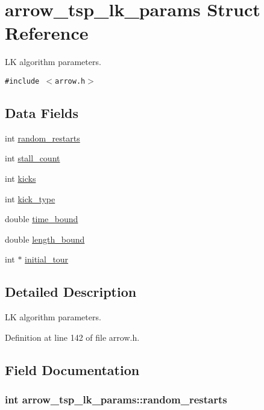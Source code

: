 \hypertarget{structarrow__tsp__lk__params}{
\section{arrow\_\-tsp\_\-lk\_\-params Struct Reference}
\label{structarrow__tsp__lk__params}
}
LK algorithm parameters.  


{\tt \#include $<$arrow.h$>$}

\subsection*{Data Fields}
\begin{CompactItemize}
\item 
int \hyperlink{structarrow__tsp__lk__params_ad3822d8c0e5d78b09618dbf716c3a4a}{random\_\-restarts}
\item 
int \hyperlink{structarrow__tsp__lk__params_ec5d500e1f1d7dabbbe0d1aae2abfcf8}{stall\_\-count}
\item 
int \hyperlink{structarrow__tsp__lk__params_9744a2fb89bca6b678fec9a6a17255ea}{kicks}
\item 
int \hyperlink{structarrow__tsp__lk__params_5b724dc268faa478b5b3e14c19abdc2a}{kick\_\-type}
\item 
double \hyperlink{structarrow__tsp__lk__params_22355808165edb6033ca771b88917cf5}{time\_\-bound}
\item 
double \hyperlink{structarrow__tsp__lk__params_36fb446a90e9b4c76702bd93f00357ea}{length\_\-bound}
\item 
int $\ast$ \hyperlink{structarrow__tsp__lk__params_1684519ac0bb6e529707b59f6cd7d528}{initial\_\-tour}
\end{CompactItemize}


\subsection{Detailed Description}
LK algorithm parameters. 

Definition at line 142 of file arrow.h.

\subsection{Field Documentation}
\hypertarget{structarrow__tsp__lk__params_ad3822d8c0e5d78b09618dbf716c3a4a}{
\subsubsection{\setlength{\rightskip}{0pt plus 5cm}int {\bf arrow\_\-tsp\_\-lk\_\-params::random\_\-restarts}}}
\label{structarrow__tsp__lk__params_ad3822d8c0e5d78b09618dbf716c3a4a}


